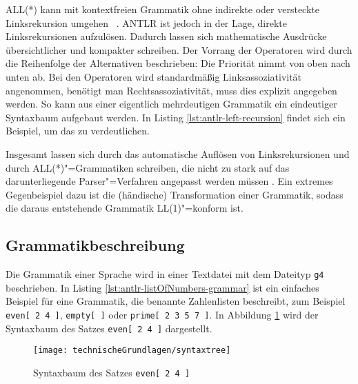 ALL(*) kann mit kontextfreien Grammatik ohne indirekte oder versteckte Linksrekursion umgehen \cite{ANTLR4Reference} \cite{ANTLRALLStar}. ANTLR ist jedoch in der Lage, direkte Linksrekursionen aufzulösen. Dadurch lassen sich mathematische Ausdrücke übersichtlicher und kompakter schreiben. Der Vorrang der Operatoren wird durch die Reihenfolge der Alternativen beschrieben: Die Priorität nimmt von oben nach unten ab. Bei den Operatoren wird standardmäßig Linksassoziativität angenommen, benötigt man Rechtsassoziativität, muss dies explizit angegeben werden. So kann aus einer eigentlich mehrdeutigen Grammatik ein eindeutiger Syntaxbaum aufgebaut werden. In Listing \ref{lst:antlr-left-recursion} findet sich ein Beispiel, um das zu verdeutlichen.

\pagebreak


Insgesamt lassen sich durch das automatische Auflösen von Linksrekursionen und durch ALL(*)"=Grammatiken schreiben, die nicht zu stark auf das darunterliegende Parser"=Verfahren angepasst werden müssen \cite{ANTLR4Reference}. Ein extremes Gegenbeispiel dazu ist die (händische) Transformation einer Grammatik, sodass die daraus entstehende Grammatik LL(1)"=konform ist.

\subsection{Grammatikbeschreibung}

Die Grammatik einer Sprache wird in einer Textdatei mit dem Dateityp \lstinline{g4} beschrieben. In Listing \ref{lst:antlr-listOfNumbers-grammar} ist ein einfaches Beispiel für eine Grammatik, die benannte Zahlenlisten beschreibt, zum Beispiel \lstinline{even[ 2 4 ]}, \lstinline{empty[ ]} oder \lstinline{prime[ 2 3 5 7 ]}. In Abbildung \ref{fig:syntaxtree} wird der Syntaxbaum des Satzes \lstinline{even[ 2 4 ]} dargestellt.



\begin{figure}[b]
    \centering
    \texttt{[image: technischeGrundlagen/syntaxtree]}
    \caption{Syntaxbaum des Satzes \lstinline{even[ 2 4 ]}}
    \label{fig:syntaxtree}
\end{figure}

